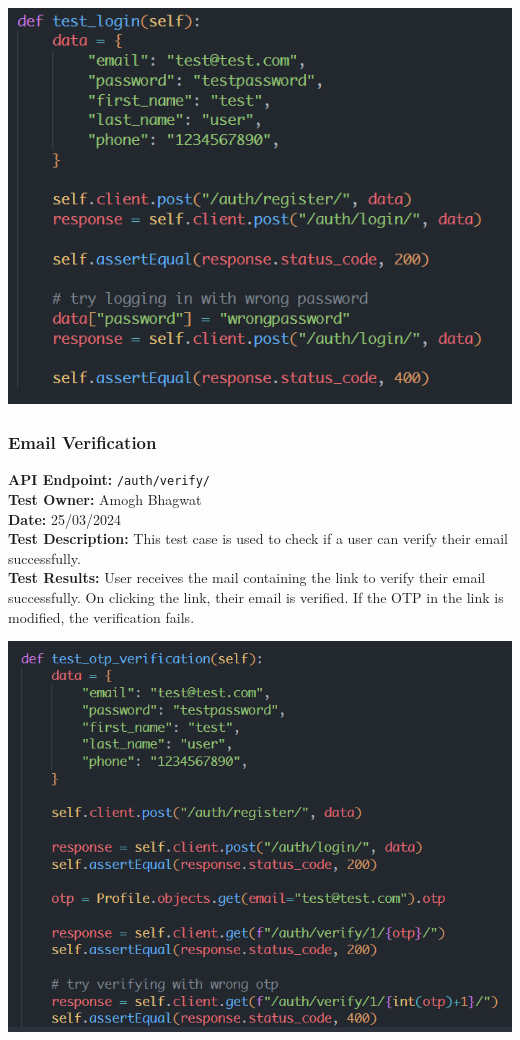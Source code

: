 \documentclass[11pt]{article}
\begin{document}
\begin{center}
    \includegraphics[scale=0.7]{unit_testing_codes/login.png}
\end{center}

\subsubsection{Email Verification}
\textbf{API Endpoint: } \texttt{/auth/verify/} \\
\textbf{Test Owner: } Amogh Bhagwat \\
\textbf{Date: } 25/03/2024 \\
\textbf{Test Description: } This test case is used to check if a user can verify their email successfully. \\
\textbf{Test Results: } User receives the mail containing the link to verify their email successfully. On clicking the link, their email is verified. If the OTP in the link is modified, the verification fails. \\

\begin{center}
    \includegraphics[scale=0.6]{unit_testing_codes/verify.png}
\end{center}
\end{document}
